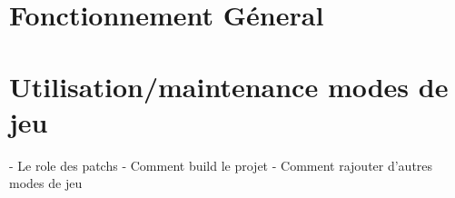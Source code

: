\section{Fonctionnement Géneral} 


\section{Utilisation/maintenance modes de jeu}
	- Le role des patchs
	- Comment build le projet
	- Comment rajouter d'autres modes de jeu
